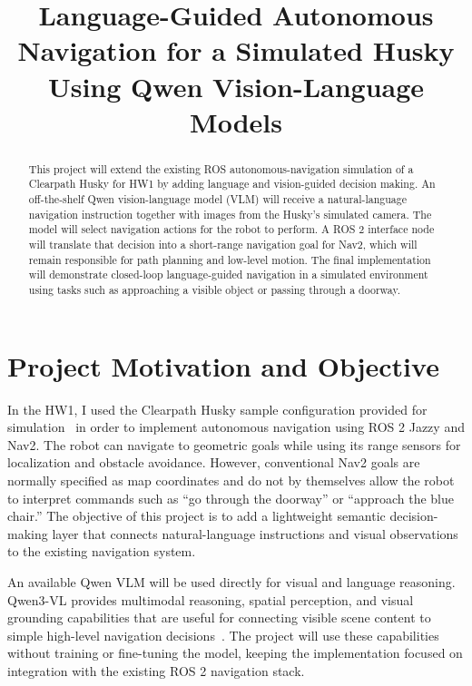 \documentclass[conference]{IEEEtran}
\begin{document}
\title{Language-Guided Autonomous Navigation for a Simulated Husky Using Qwen Vision-Language Models}

\author{
}

\maketitle

\begin{abstract}
This project will extend the existing ROS autonomous-navigation simulation of a Clearpath Husky for HW1 by adding language and vision-guided decision making. An off-the-shelf Qwen vision-language model (VLM) will receive a natural-language navigation instruction together with images from the Husky's simulated camera. The model will select navigation actions for the robot to perform. A ROS 2 interface node will translate that decision into a short-range navigation goal for Nav2, which will remain responsible for path planning and low-level motion. The final implementation will demonstrate closed-loop language-guided navigation in a simulated environment using tasks such as approaching a visible object or passing through a doorway.
\end{abstract}


\section{Project Motivation and Objective}
In the HW1, I used the Clearpath Husky sample configuration provided for simulation~\cite{clearpathyaml} in order to implement autonomous navigation using ROS 2 Jazzy and Nav2. The robot can navigate to geometric goals while using its range sensors for localization and obstacle avoidance. However, conventional Nav2 goals are normally specified as map coordinates and do not by themselves allow the robot to interpret commands such as ``go through the doorway'' or ``approach the blue chair.'' The objective of this project is to add a lightweight semantic decision-making layer that connects natural-language instructions and visual observations to the existing navigation system.

An available Qwen VLM will be used directly for visual and language reasoning. Qwen3-VL provides multimodal reasoning, spatial perception, and visual grounding capabilities that are useful for connecting visible scene content to simple high-level navigation decisions~\cite{qwen3vl}. The project will use these capabilities without training or fine-tuning the model, keeping the implementation focused on integration with the existing ROS 2 navigation stack.
\end{document}
